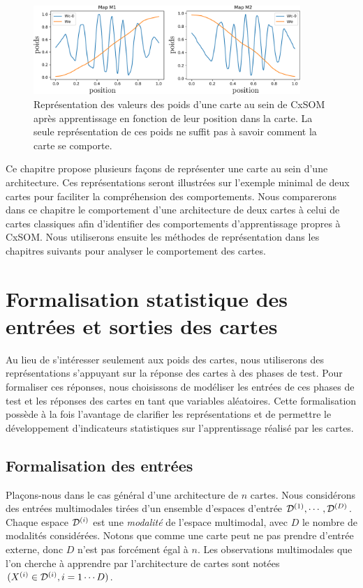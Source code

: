 \documentclass[../main]{subfiles}
\begin{document}
\begin{figure}
\centering
\includegraphics[width=0.9\textwidth]{weights_cercle1.pdf}

\caption{Représentation des valeurs des poids d'une carte au sein de CxSOM après apprentissage en fonction de leur position dans la carte. La seule représentation de ces poids ne suffit pas à savoir comment la carte se comporte.\label{fig:weights}}
\end{figure}

Ce chapitre propose plusieurs façons de représenter une carte au sein d'une architecture.
Ces représentations seront illustrées sur l'exemple minimal de deux cartes pour faciliter la compréhension des comportements. 
Nous comparerons dans ce chapitre le comportement d'une architecture de deux cartes à celui de cartes classiques afin d'identifier des comportements d'apprentissage propres à CxSOM.
Nous utiliserons ensuite les méthodes de représentation dans les chapitres suivants pour analyser le comportement des cartes.

\section{Formalisation statistique des entrées et sorties des cartes}

Au lieu de s'intéresser seulement aux poids des cartes, nous utiliserons des représentations s'appuyant sur la réponse des cartes à des phases de test.
Pour formaliser ces réponses, nous choisissons de modéliser les entrées de ces phases de test et les réponses des cartes en tant que variables aléatoires.
Cette formalisation possède à la fois l'avantage de clarifier les représentations et de permettre le développement d'indicateurs statistiques sur l'apprentissage réalisé par les cartes.

\subsection{Formalisation des entrées}

Plaçons-nous dans le cas général d'une architecture de $n$ cartes.
Nous considérons des entrées multimodales tirées d'un ensemble d'espaces d'entrée $\mathcal{D}^{({1})},\cdots,\mathcal{D}^{({D})}$. Chaque espace $\mathcal{D}^{({i})}$ est une \emph{modalité} de l'espace multimodal, avec $D$ le nombre de modalités considérées. Notons que comme une carte peut ne pas prendre d'entrée externe, donc $D$ n'est pas forcément égal à $n$.
Les observations multimodales que l'on cherche à apprendre par l'architecture de cartes sont notées $(X^{({i})} \in \mathcal{D}^{({i})}, i = 1 \cdots D)$.
\end{document}
